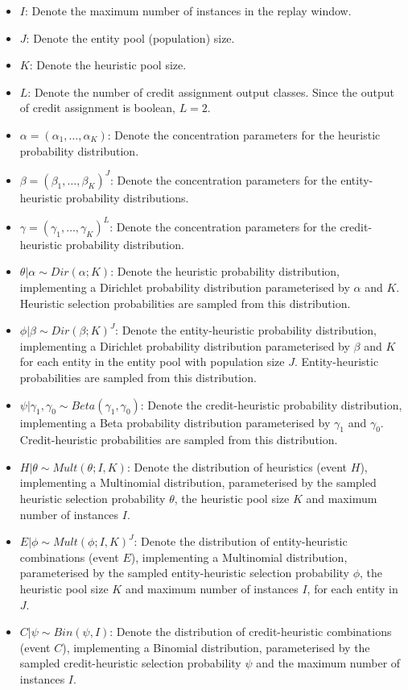 \begin{itemize}
      \item $I$: Denote the maximum number of instances in the replay window.
      \item $J$: Denote the entity pool (population) size.
      \item $K$: Denote the heuristic pool size.
      \item $L$: Denote the number of credit assignment output classes. Since the output of credit assignment is boolean, $L = 2$.

      \item $\alpha = (\alpha_{1}, \dots, \alpha_{K})$: Denote the concentration parameters for the heuristic probability distribution.
      \item $\beta = (\beta_{1}, \dots, \beta_{K})^{J}$: Denote the concentration parameters for the entity-heuristic probability distributions.
      \item $\gamma = (\gamma_{1}, \dots, \gamma_{K})^{L}$: Denote the concentration parameters for the credit-heuristic probability distribution.

      \item $\theta \vert \alpha \sim Dir(\alpha; K)$: Denote the heuristic probability distribution, implementing a Dirichlet probability distribution parameterised by $\alpha$ and $K$. Heuristic selection probabilities are sampled from this distribution.
      \item $\phi \vert \beta \sim Dir(\beta; K)^{J}$: Denote the entity-heuristic probability distribution, implementing a Dirichlet probability distribution parameterised by $\beta$ and $K$ for each entity in the entity pool with population size $J$. Entity-heuristic probabilities are sampled from this distribution.
      \item $\psi \vert \gamma_{1}, \gamma_{0}  \sim Beta(\gamma_{1}, \gamma_{0})$: Denote the credit-heuristic probability distribution, implementing a Beta probability distribution parameterised by $\gamma_{1}$ and $\gamma_{0}$. Credit-heuristic probabilities are sampled from this distribution.

      \item $H \vert \theta \sim Mult(\theta; I, K)$: Denote the distribution of heuristics (event $H$), implementing a Multinomial distribution, parameterised by the sampled heuristic selection probability $\theta$, the heuristic pool size $K$ and maximum number of instances $I$.
      \item $E \vert \phi \sim Mult(\phi; I, K)^{J}$: Denote the distribution of entity-heuristic combinations (event $E$), implementing a Multinomial distribution, parameterised by the sampled entity-heuristic selection probability $\phi$, the heuristic pool size $K$ and maximum number of instances $I$, for each entity in $J$.
      \item $C \vert \psi \sim Bin(\psi, I)$: Denote the distribution of credit-heuristic combinations (event $C$), implementing a Binomial distribution, parameterised by the sampled credit-heuristic selection probability $\psi$ and the maximum number of instances $I$.
\end{itemize}


